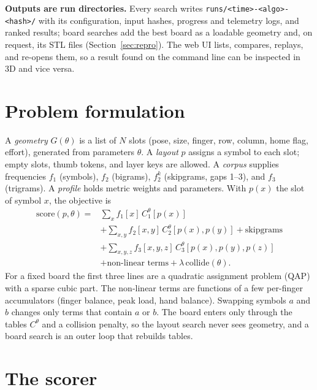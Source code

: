 \documentclass{gecko-paper}
\begin{document}
\begin{paperbody}
\textbf{Outputs are run directories.} Every search writes \texttt{runs/<time>-<algo>-<hash>/} with its configuration, input hashes, progress and telemetry logs, and ranked results; board searches add the best board as a loadable geometry and, on request, its STL files (Section~\ref{sec:repro}). The web UI lists, compares, replays, and re-opens them, so a result found on the command line can be inspected in 3D and vice versa.

\section{Problem formulation}
A \emph{geometry} $G(\theta)$ is a list of $N$ slots (pose, size, finger, row, column, home flag, effort), generated from parameters $\theta$. A \emph{layout} $p$ assigns a symbol to each slot; empty slots, thumb tokens, and layer keys are allowed. A \emph{corpus} supplies frequencies $f_1$ (symbols), $f_2$ (bigrams), $f_2^{k}$ (skipgrams, gaps 1–3), and $f_3$ (trigrams). A \emph{profile} holds metric weights and parameters. With $p(x)$ the slot of symbol $x$, the objective is
\begin{align*}
\mathrm{score}(p,\theta) ={}& \textstyle\sum_x f_1[x]\,C_1^{\theta}[p(x)]\\
&+\textstyle\sum_{x,y} f_2[x,y]\,C_2^{\theta}[p(x),p(y)] + \text{skipgrams}\\
&+\textstyle\sum_{x,y,z} f_3[x,y,z]\,C_3^{\theta}[p(x),p(y),p(z)]\\
&+\text{non-linear terms} + \lambda\,\mathrm{collide}(\theta).
\end{align*}
For a fixed board the first three lines are a quadratic assignment problem (QAP) with a sparse cubic part. The non-linear terms are functions of a few per-finger accumulators (finger balance, peak load, hand balance). Swapping symbols $a$ and $b$ changes only terms that contain $a$ or $b$. The board enters only through the tables $C^{\theta}$ and a collision penalty, so the layout search never sees geometry, and a board search is an outer loop that rebuilds tables.

\section{The scorer}\label{sec:scorer}

\end{paperbody}
\end{document}
